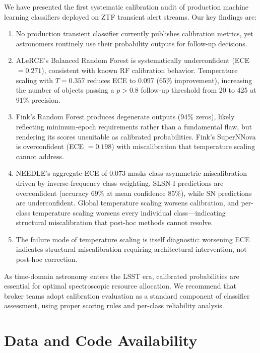 \documentclass[twocolumn]{aastex631}
\begin{document}
We have presented the first systematic calibration audit of production machine learning classifiers deployed on ZTF transient alert streams. Our key findings are:

\begin{enumerate}
    \item No production transient classifier currently publishes calibration metrics, yet astronomers routinely use their probability outputs for follow-up decisions.

    \item ALeRCE's Balanced Random Forest is systematically underconfident (ECE $= 0.271$), consistent with known RF calibration behavior. Temperature scaling with $T = 0.357$ reduces ECE to 0.097 (65\% improvement), increasing the number of objects passing a $p > 0.8$ follow-up threshold from 20 to 425 at 91\% precision.

    \item Fink's Random Forest produces degenerate outputs (94\% zeros), likely reflecting minimum-epoch requirements rather than a fundamental flaw, but rendering its scores unsuitable as calibrated probabilities. Fink's SuperNNova is overconfident (ECE $= 0.198$) with miscalibration that temperature scaling cannot address.

    \item NEEDLE's aggregate ECE of 0.073 masks class-asymmetric miscalibration driven by inverse-frequency class weighting. SLSN-I predictions are overconfident (accuracy 69\% at mean confidence 85\%), while SN predictions are underconfident. Global temperature scaling worsens calibration, and per-class temperature scaling worsens every individual class---indicating structural miscalibration that post-hoc methods cannot resolve.

    \item The failure mode of temperature scaling is itself diagnostic: worsening ECE indicates structural miscalibration requiring architectural intervention, not post-hoc correction.
\end{enumerate}

As time-domain astronomy enters the LSST era, calibrated probabilities are essential for optimal spectroscopic resource allocation. We recommend that broker teams adopt calibration evaluation as a standard component of classifier assessment, using proper scoring rules and per-class reliability analysis.


\section*{Data and Code Availability}
\end{document}
